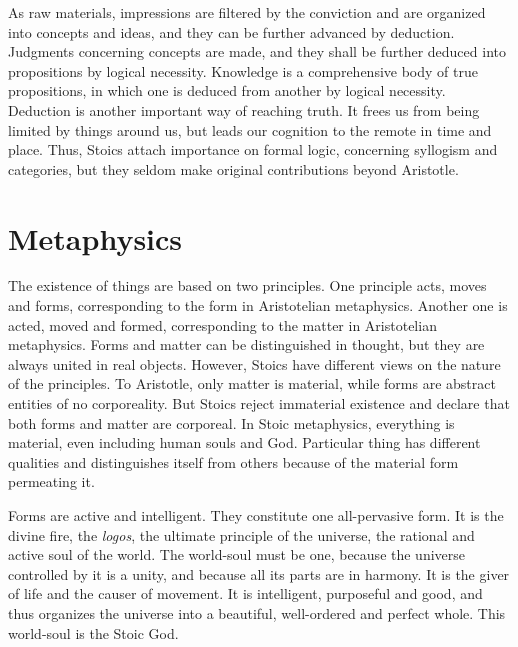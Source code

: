 \documentclass[11pt]{article}
\begin{document}
\newline

As raw materials, impressions are filtered by the conviction and are organized into concepts and ideas, and they can be further advanced by deduction. 
Judgments concerning concepts are made, and they shall be further deduced into propositions by logical necessity. 
Knowledge is a comprehensive body of true propositions, in which one is deduced from another by logical necessity. 
Deduction is another important way of reaching truth. 
It frees us from being limited by things around us, but leads our cognition to the remote in time and place. 
Thus, Stoics attach importance on formal logic, concerning syllogism and categories, but they seldom make original contributions beyond Aristotle.

\section{Metaphysics}
The existence of things are based on two principles. 
One principle acts, moves and forms, corresponding to the form in Aristotelian metaphysics. 
Another one is acted, moved and formed, corresponding to the matter in Aristotelian metaphysics. 
Forms and matter can be distinguished in thought, but they are always united in real objects. 
However, Stoics have different views on the nature of the principles. 
To Aristotle, only matter is material, while forms are abstract entities of no corporeality. 
But Stoics reject immaterial existence and declare that both forms and matter are corporeal. 
In Stoic metaphysics, everything is material, even including human souls and God. 
Particular thing has different qualities and distinguishes itself from others because of the material form permeating it.

\newline

Forms are active and intelligent. 
They constitute one all-pervasive form. 
It is the divine fire, the \textit{logos}, the ultimate principle of the universe, the rational and active soul of the world. 
The world-soul must be one, because the universe controlled by it is a unity, and because all its parts are in harmony. 
It is the giver of life and the causer of movement. 
It is intelligent, purposeful and good, and thus organizes the universe into a beautiful, well-ordered and perfect whole. 
This world-soul is the Stoic God.

\newline
\end{document}
